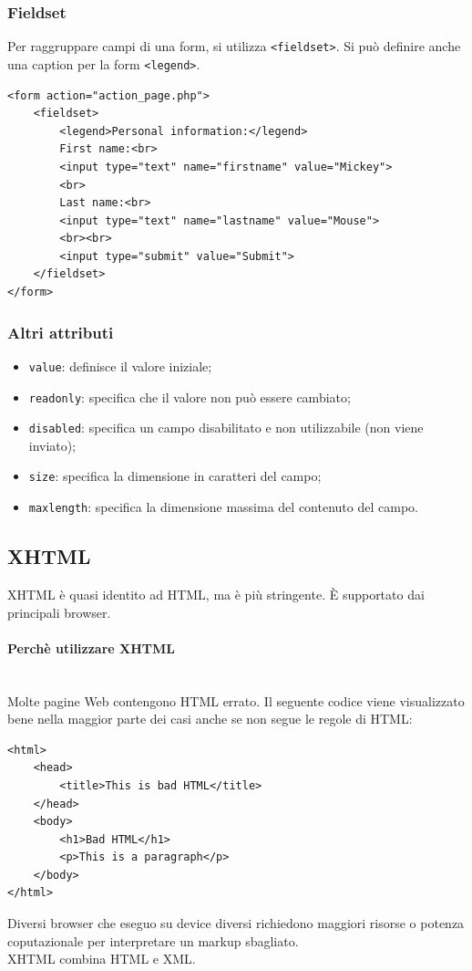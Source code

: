 \documentclass{article}
\begin{document}
\subsubsection{Fieldset}
Per raggruppare campi di una form, si utilizza \texttt{<fieldset>}. Si può definire anche una caption per la form \texttt{<legend>}.
\begin{lstlisting}[style=htmlstyle]
<form action="action_page.php">
    <fieldset>
        <legend>Personal information:</legend>
        First name:<br>
        <input type="text" name="firstname" value="Mickey">
        <br>
        Last name:<br>
        <input type="text" name="lastname" value="Mouse">
        <br><br>
        <input type="submit" value="Submit">
    </fieldset>
</form>
\end{lstlisting}
\subsubsection{Altri attributi}
\begin{itemize}
    \item \texttt{value}: definisce il valore iniziale;
    \item \texttt{readonly}: specifica che il valore non può essere cambiato;
    \item \texttt{disabled}: specifica un campo disabilitato e non utilizzabile (non viene inviato);
    \item \texttt{size}: specifica la dimensione in caratteri del campo;
    \item \texttt{maxlength}: specifica la dimensione massima del contenuto del campo.
\end{itemize}
\pagebreak
\subsection{XHTML}
XHTML è quasi identito ad HTML, ma è più stringente. È supportato dai principali browser.
\paragraph{Perchè utilizzare XHTML} \mbox{}
\\ Molte pagine Web contengono HTML errato. Il seguente codice viene visualizzato bene nella maggior parte dei casi anche
se non segue le regole di HTML:
\begin{lstlisting}[style=htmlstyle]
<html>
    <head>
        <title>This is bad HTML</title>
    </head>
    <body>
        <h1>Bad HTML</h1>
        <p>This is a paragraph</p>
    </body>
</html>
\end{lstlisting}
Diversi browser che eseguo su device diversi richiedono maggiori risorse o potenza coputazionale per interpretare un markup sbagliato.
\\ XHTML combina HTML e XML.
\end{document}
